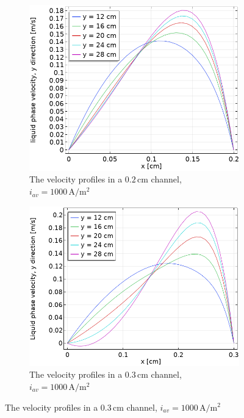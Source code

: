 \begin{figure}
\centering
\begin{subfigure}{.5\textwidth}
  \centering
  \includegraphics[width=1\linewidth]{velocityprofilenosaff2mm1000A.png}
  \caption{The velocity profiles in a $0.2 \,\mathrm{cm}$ channel, $i_{av}=1000 \, \mathrm{A/m^2}$}
\end{subfigure}%
\begin{subfigure}{.5\textwidth}
  \centering
  \includegraphics[width=1\linewidth]{velocityprofilenosaff3mm1000A.png}
  \caption{The velocity profiles in a $0.3 \,\mathrm{cm}$ channel, $i_{av}=1000 \, \mathrm{A/m^2}$}
\end{subfigure}

\end{figure}
